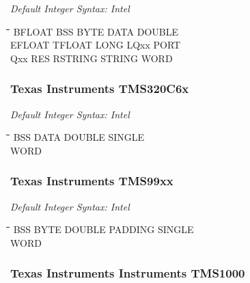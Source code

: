 {\em Default Integer Syntax: Intel}

{\tt\begin{tabbing}
\hspace{3cm}\=\hspace{3cm}\=\hspace{3cm}\=\hspace{3cm}\=\kill
BFLOAT     \> BSS         \> BYTE        \> DATA        \> DOUBLE \\
EFLOAT     \> TFLOAT      \> LONG        \> LQxx        \> PORT \\
Qxx        \> RES         \> RSTRING     \> STRING      \> WORD \\
\end{tabbing}}

\subsubsection{Texas Instruments TMS320C6x}

{\em Default Integer Syntax: Intel}

{\tt\begin{tabbing}
\hspace{3cm}\=\hspace{3cm}\=\hspace{3cm}\=\hspace{3cm}\=\kill
BSS         \> DATA        \> DOUBLE     \> SINGLE \\
WORD \\
\end{tabbing}}

\subsubsection{Texas Instruments TMS99xx}

{\em Default Integer Syntax: Intel}

{\tt\begin{tabbing}
\hspace{3cm}\=\hspace{3cm}\=\hspace{3cm}\=\hspace{3cm}\=\kill
BSS        \> BYTE        \> DOUBLE      \> PADDING     \> SINGLE \\
WORD \\
\end{tabbing}}

\subsubsection{Texas Instruments Instruments TMS1000}

